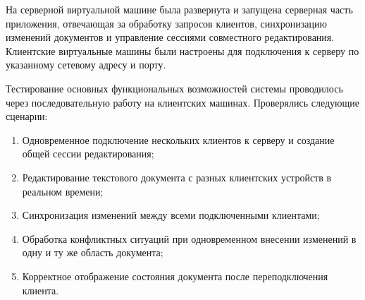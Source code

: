 На серверной виртуальной машине была развернута и запущена серверная часть приложения, отвечающая за обработку запросов клиентов, синхронизацию изменений документов и управление сессиями совместного редактирования. Клиентские виртуальные машины были настроены для подключения к серверу по указанному сетевому адресу и порту.

Тестирование основных функциональных возможностей системы проводилось через последовательную работу на клиентских машинах. Проверялись следующие сценарии:

\begin{enumerate}
    \item Одновременное подключение нескольких клиентов к серверу и создание общей сессии редактирования;
    \item Редактирование текстового документа с разных клиентских устройств в реальном времени;
    \item Синхронизация изменений между всеми подключенными клиентами;
    \item Обработка конфликтных ситуаций при одновременном внесении изменений в одну и ту же область документа;
    \item Корректное отображение состояния документа после переподключения клиента.
\end{enumerate}
